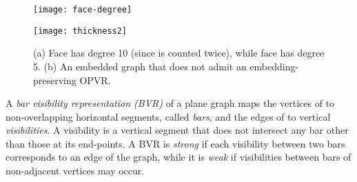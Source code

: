 \documentclass{article}
\newcommand{\opvr}{OPVR\xspace}
\begin{document}
\begin{figure}[tb]
    \centering
    \begin{minipage}[b]{.3\textwidth}
    	\centering
    	\texttt{[image: face-degree]}
    	\subcaption{}\label{fi:face-degree}
    \end{minipage}
    \hfil
    \begin{minipage}[b]{.3\textwidth}
    	\centering
    	\texttt{[image: thickness2]}
    	\subcaption{}\label{fi:thickness2}
    \end{minipage}
    \caption{ (a) Face  has degree 10 (since  is counted twice), while face  has degree 5. (b) An embedded graph that does not admit an embedding-preserving \opvr.}
\end{figure} 

A \emph{bar visibility representation (BVR)} of a plane graph  maps the vertices of  to non-overlapping horizontal segments, called \emph{bars}, and the edges of  to vertical \emph{visibilities}.  A visibility is a vertical segment that does not intersect any bar other than those at its end-points. A BVR is \emph{strong} if each visibility between two bars corresponds to an edge of the graph, while it is \emph{weak} if visibilities between bars of non-adjacent vertices may occur. 
\end{document}
